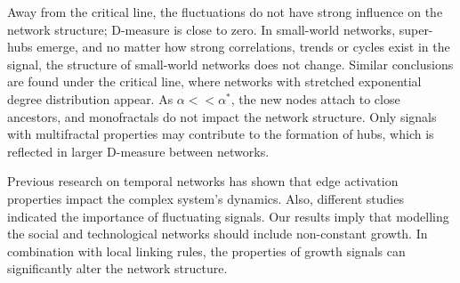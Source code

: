 Away from the critical line, the fluctuations do not have strong influence on %
 the network structure; D-measure is close to zero. In small-world networks, super-hubs emerge, and no matter how strong correlations, trends or cycles exist in the signal, the structure of small-world networks does not change. Similar conclusions are found under the critical line, where networks with stretched exponential degree distribution appear. As $\alpha<<\alpha^{*}$, the new nodes attach to close ancestors, and monofractals do not impact the network structure. Only signals with multifractal properties may contribute to the formation of hubs, which is reflected in larger D-measure between networks. 

Previous research on temporal networks \cite{holme2012} has shown that edge activation properties impact the complex system's dynamics. Also, different studies indicated the importance of fluctuating signals. %
Our results imply that modelling the social and technological networks should include non-constant growth. In combination with local linking rules, the properties of growth signals can significantly alter the network structure. 



